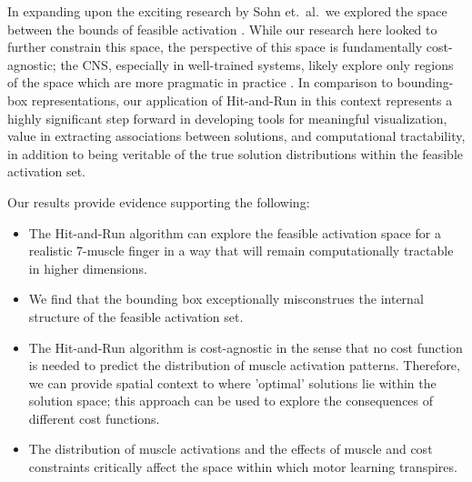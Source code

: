 In expanding upon the exciting research by Sohn et.\ al.\, we explored the space between the bounds of feasible activation \cite{sohn2013cat_bounding_box}.
While our research here looked to further constrain this space, the perspective of this space is fundamentally cost-agnostic; the CNS, especially in well-trained systems, likely explore only regions of the space which are more pragmatic in practice \cite{todorov2002optimal}.
In comparison to bounding-box representations, our application of Hit-and-Run in this context represents a highly significant step forward in developing tools for meaningful visualization, value in extracting associations between solutions, and computational tractability, in addition to being veritable of the true solution distributions within the feasible activation set.

Our results provide evidence supporting the following:
\begin{itemize}
	\item{The Hit-and-Run algorithm can explore the feasible activation space for a realistic 7-muscle finger in a way that will remain computationally tractable in higher dimensions.}
	\item{We find that the bounding box exceptionally misconstrues the internal structure of the feasible activation set.}
	\item{The Hit-and-Run algorithm is cost-agnostic in the sense that no cost function is needed to predict the distribution of muscle activation patterns.
	Therefore, we can provide spatial context to where 'optimal' solutions lie within the solution space; this approach can be used to explore the consequences of different cost functions.}
	\item{The distribution of muscle activations and the effects of muscle and cost constraints critically affect the space within which motor learning transpires.}
\end{itemize}

